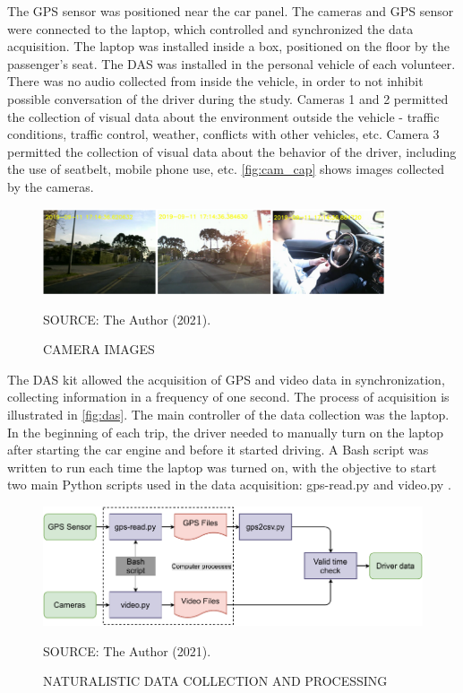 The GPS sensor was positioned near the car panel. The cameras and GPS sensor were connected to the laptop, which controlled and synchronized the data acquisition. The laptop was installed inside a box, positioned on the floor by the passenger's seat. The DAS was installed in the personal vehicle of each volunteer. There was no audio collected from inside the vehicle, in order to not inhibit possible conversation of the driver during the study. Cameras 1 and 2 permitted the collection of visual data about the environment outside the vehicle - traffic conditions, traffic control, weather, conflicts with other vehicles, etc. Camera 3 permitted the collection of visual data about the behavior of the driver, including the use of seatbelt, mobile phone use, etc. \autoref{fig:cam_cap} shows images collected by the cameras.  

\begin{figure}[!htbp]
    \centering\footnotesize
    \captionsetup{font=footnotesize}
    \caption{CAMERA IMAGES}
    \includegraphics[width=0.9\textwidth]{fig/cam_cap.png}
    \label{fig:cam_cap}
    \par SOURCE: The Author (2021).
\end{figure}


The DAS kit allowed the acquisition of GPS and video data in synchronization, collecting information in a frequency of one second. The process of acquisition is illustrated in \autoref{fig:das}. The main controller of the data collection was the laptop. In the beginning of each trip, the driver needed to manually turn on the laptop after starting the car engine and before it started driving. A Bash script was written to run each time the laptop was turned on, with the objective to start two main Python scripts used in the data acquisition: gps-read.py and video.py \cite{Borguezani2020}.  

\begin{figure}[!htbp]
    \centering\footnotesize
    \captionsetup{font=footnotesize}
    \caption{NATURALISTIC DATA COLLECTION AND PROCESSING}
    \includegraphics{fig/DAS.pdf}
    \label{fig:das}
    \par SOURCE: The Author (2021).
\end{figure}

